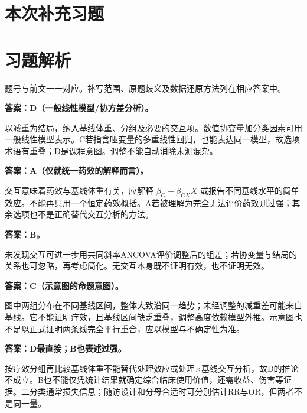 
\clearpage\section{本次补充习题}


\clearpage\section{习题解析}

\begin{keyidea}[核对方式]题号与前文一一对应。补写范围、原题歧义及数据还原方法列在相应答案中。\end{keyidea}


\textbf{答案：D（一般线性模型/协方差分析）。}

以减重为结局，纳入基线体重、分组及必要的交互项。数值协变量加分类因素可用一般线性模型表示。C若指含哑变量的多重线性回归，也能表达同一模型，故选项术语有重叠；D是课程意图。调整不能自动消除未测混杂。



\textbf{答案：A（仅就统一药效的解释而言）。}

交互意味着药效与基线体重有关，应解释 \(\beta_G+\beta_{GX}X\) 或报告不同基线水平的简单效应。不能再只用一个恒定药效概括。A若被理解为完全无法评价药效则过强；其余选项也不是正确替代交互分析的方法。



\textbf{答案：B。}

未发现交互可进一步用共同斜率ANCOVA评价调整后的组差；若协变量与结局的关系也可忽略，再考虑简化。无交互本身既不证明有效，也不证明无效。



\textbf{答案：C（示意图的命题意图）。}

图中两组分布在不同基线区间，整体大致沿同一趋势；未经调整的减重差可能来自基线。它不能证明疗效，且基线区间缺乏重叠，调整高度依赖模型外推。示意图也不足以正式证明两条线完全平行重合，应以模型与不确定性为准。



\textbf{答案：D最直接；B也表述过强。}

按疗效分组再比较基线体重不能替代处理效应或处理×基线交互分析，故D的推论不成立。B也不能仅凭统计结果就确定综合临床使用价值，还需收益、伤害等证据。二分类通常损失信息；随访设计和分母合适时可分别估计RR与OR，但两者不是同一量。


